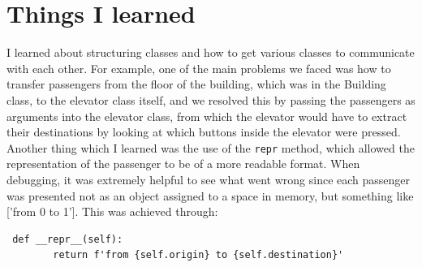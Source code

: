 \documentclass{article}
\begin{document}
 \section*{Things I learned}
 I learned about structuring classes and how to get various classes to communicate with each other. For example, one of the main problems we faced was how to transfer passengers from the floor of the building, which was in the Building class, to the elevator class itself, and we resolved this by passing the passengers as arguments into the elevator class, from which the elevator would have to extract their destinations by looking at which buttons inside the elevator were pressed.\\
 
 Another thing which I learned was the use of the \texttt{repr} method, which allowed the representation of the passenger to be of a more readable format. When debugging, it was extremely helpful to see what went wrong since each passenger was presented not as an object assigned to a space in memory, but something like ['from 0 to 1']. This was achieved through: 
 \begin{verbatim}
 def __repr__(self):
        return f'from {self.origin} to {self.destination}' 	
 \end{verbatim}

 
 









	
\end{document}
